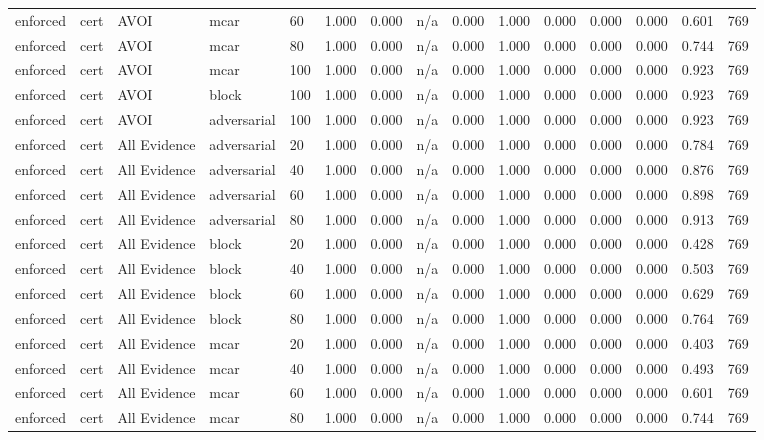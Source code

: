 \begin{table}[!ht]
{\begin{tabular}{lllllllllllllll}
enforced & cert & AVOI & mcar & 60 & 1.000 & 0.000 & n/a & 0.000 & 1.000 & 0.000 & 0.000 & 0.000 & 0.601 & 769 \\
enforced & cert & AVOI & mcar & 80 & 1.000 & 0.000 & n/a & 0.000 & 1.000 & 0.000 & 0.000 & 0.000 & 0.744 & 769 \\
enforced & cert & AVOI & mcar & 100 & 1.000 & 0.000 & n/a & 0.000 & 1.000 & 0.000 & 0.000 & 0.000 & 0.923 & 769 \\
enforced & cert & AVOI & block & 100 & 1.000 & 0.000 & n/a & 0.000 & 1.000 & 0.000 & 0.000 & 0.000 & 0.923 & 769 \\
enforced & cert & AVOI & adversarial & 100 & 1.000 & 0.000 & n/a & 0.000 & 1.000 & 0.000 & 0.000 & 0.000 & 0.923 & 769 \\
enforced & cert & All Evidence & adversarial & 20 & 1.000 & 0.000 & n/a & 0.000 & 1.000 & 0.000 & 0.000 & 0.000 & 0.784 & 769 \\
enforced & cert & All Evidence & adversarial & 40 & 1.000 & 0.000 & n/a & 0.000 & 1.000 & 0.000 & 0.000 & 0.000 & 0.876 & 769 \\
enforced & cert & All Evidence & adversarial & 60 & 1.000 & 0.000 & n/a & 0.000 & 1.000 & 0.000 & 0.000 & 0.000 & 0.898 & 769 \\
enforced & cert & All Evidence & adversarial & 80 & 1.000 & 0.000 & n/a & 0.000 & 1.000 & 0.000 & 0.000 & 0.000 & 0.913 & 769 \\
enforced & cert & All Evidence & block & 20 & 1.000 & 0.000 & n/a & 0.000 & 1.000 & 0.000 & 0.000 & 0.000 & 0.428 & 769 \\
enforced & cert & All Evidence & block & 40 & 1.000 & 0.000 & n/a & 0.000 & 1.000 & 0.000 & 0.000 & 0.000 & 0.503 & 769 \\
enforced & cert & All Evidence & block & 60 & 1.000 & 0.000 & n/a & 0.000 & 1.000 & 0.000 & 0.000 & 0.000 & 0.629 & 769 \\
enforced & cert & All Evidence & block & 80 & 1.000 & 0.000 & n/a & 0.000 & 1.000 & 0.000 & 0.000 & 0.000 & 0.764 & 769 \\
enforced & cert & All Evidence & mcar & 20 & 1.000 & 0.000 & n/a & 0.000 & 1.000 & 0.000 & 0.000 & 0.000 & 0.403 & 769 \\
enforced & cert & All Evidence & mcar & 40 & 1.000 & 0.000 & n/a & 0.000 & 1.000 & 0.000 & 0.000 & 0.000 & 0.493 & 769 \\
enforced & cert & All Evidence & mcar & 60 & 1.000 & 0.000 & n/a & 0.000 & 1.000 & 0.000 & 0.000 & 0.000 & 0.601 & 769 \\
enforced & cert & All Evidence & mcar & 80 & 1.000 & 0.000 & n/a & 0.000 & 1.000 & 0.000 & 0.000 & 0.000 & 0.744 & 769 \\

\end{tabular}}
\end{table}
